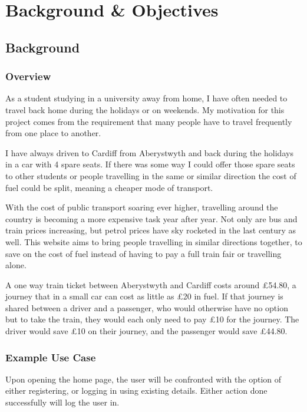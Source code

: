 \chapter{Background \& Objectives}
\section{Background}
\subsection{Overview}
As a student studying in a university away from home, I have often needed to travel back home during the holidays or on weekends. My motivation for this project comes from the requirement that many people have to travel frequently from one place to another. 

I have always driven to Cardiff from Aberystwyth and back during the holidays in a car with 4 spare seats. If there was some way I could offer those spare seats to other students or people travelling in the same or similar direction the cost of fuel could be split, meaning a cheaper mode of transport.

With the cost of public transport soaring ever higher\cite{gov_public_transport_doc}, travelling around the country is becoming a more expensive task year after year. Not only are bus and train prices increasing, but petrol prices have sky rocketed in the last century\cite{guardian_fuel_prices} as well. This website aims to bring people travelling in similar directions together, to save on the cost of fuel instead of having to pay a full train fair or travelling alone. 

A one way train ticket between Aberystwyth and Cardiff costs around \pounds 54.80\cite{trainline_aber_cardiff_price}, a journey that in a small car can cost as little as \pounds 20 in fuel. If that journey is shared between a driver and a passenger, who would otherwise have no option but to take the train, they would each only need to pay \pounds 10 for the journey. The driver would save \pounds 10 on their journey, and the passenger would save \pounds 44.80.


\subsection{Example Use Case}
	Upon opening the home page, the user will be confronted with the option of either registering, or logging in using existing details. Either action done successfully will log the user in.
	
